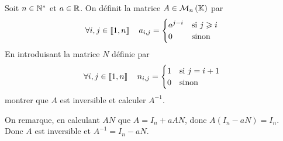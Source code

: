 \documentclass{magnolia}
\begin{document}





Soit $n\in{\mathbb{N}^*}$ et $a\in\mathbb{R}$. On définit la matrice $A\in\mathcal{M}_{n}\left(\mathbb{K}\right)$ par
\[\forall i,j\in\left\llbracket 1,n\right\rrbracket \quad a_{i,j}=
  \begin{cases}
  a^{j-i} & \text{si $j\geqslant i$}\\
  0 & \text{sinon}
  \end{cases}\]
En introduisant la matrice $N$ définie par
\[\forall i,j\in\left\llbracket 1,n\right\rrbracket \quad n_{i,j}=
  \begin{cases}
  1 & \text{si $j=i+1$}\\
  0 & \text{sinon}
  \end{cases}\]
montrer que $A$ est inversible et calculer $A^{-1}$.
\begin{sol}
On remarque, en calculant $AN$ que $A=I_n+aAN$, donc $A(I_n-aN)=I_n$. Donc
$A$ est inversible et $A^{-1}=I_n-aN$.
\end{sol}


\end{document}
